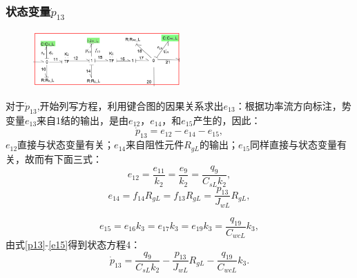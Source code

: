 \subsubsection{状态变量$\dot{ p}_{13} $}
\begin{figure}[H]
	\centering
	\includegraphics[width=0.5\textwidth]{fig/equation4.png}
	\caption{}\label{fig:equation4}
\end{figure}
对于$\dot{p} _ { 13 }$,开始列写方程，利用键合图的因果关系求出$e_{13}$：根据功率流方向标注，势变量$e_{13}$来自1结的输出，是由$e_{12}$，$e_{14}$，和$e_{15}$产生的，因此：
\begin{equation}\label{p13}
\dot{ p } _ { 13 } = e _ { 12 } - e _ { 14 } - e _ { 15 },
\end{equation}
$e_{12}$直接与状态变量有关；$e_{14}$来自阻性元件$R _ { gL }$的输出；$e_{15}$同样直接与状态变量有关，故而有下面三式：
\begin{equation}
e _ { 12 } = \frac { e _ { 11 } } { k _ { 2 } } = \frac { e _ { 9 } } { k _ { 2 } } = \frac { q _ { 9 } } { C _ { sL  } k _ { 2 } },
\end{equation}
\begin{equation}
e _ { 14 } = f _ { 14 } R _ { gL}  = f _ { 13 } R _ { gL}  = \frac { p _ { 13 } } { J _ { wL}  } R _ { gL } ,
\end{equation}

\begin{equation}\label{e15}
e _ { 15 } = e _ { 16 } k _ { 3 } = e _ { 17 } k _ { 3 } = e _ { 19 } k _ { 3 } = \frac { q _ { 19 } } { C _ { w cL }  } k _ { 3 } ,
\end{equation}
由式\ref{p13}-\ref{e15}得到状态方程4：
\begin{equation}
\dot{ p }_ { 13 } = \frac { q _ { 9 } } { C _ { sL}  k _ { 2 } } - \frac { p _ { 13 } } { J _ { wL}  } R _ { gL }  - \frac { q _ { 19 } } { C _ { w cL}  } k _ { 3 }.
\end{equation}
